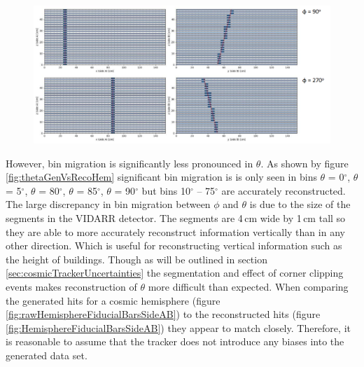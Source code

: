 \begin{figure}[htbp]
 \centering
 \includegraphics[width=\linewidth]{Chapter5/Figs/cosmicBinMigrationSideB.png}
 \label{fig:cosmicBinMigrationSideB}
\end{figure}

However, bin migration is significantly less pronounced in $\theta$. As shown by figure \ref{fig:thetaGenVsRecoHem} significant bin migration is is only seen in bins $\theta$ = 0$^\circ$, $\theta$ = 5$^\circ$, $\theta$ = 80$^\circ$, $\theta$ = 85$^\circ$, $\theta$ = 90$^\circ$ but bins 10$^\circ$ -- 75$^\circ$ are accurately reconstructed. The large discrepancy in bin migration between $\phi$ and $\theta$ is due to the size of the segments in the VIDARR detector. The segments are 4\,cm wide by 1\,cm tall so they are able to more accurately reconstruct information vertically than in any other direction. Which is useful for reconstructing vertical information such as the height of buildings. Though as will be outlined in section \ref{sec:cosmicTrackerUncertainties} the segmentation and effect of corner clipping events makes reconstruction of $\theta$ more difficult than expected. When comparing the generated hits for a cosmic hemisphere (figure \ref{fig:rawHemisphereFiducialBarsSideAB}) to the reconstructed hits (figure \ref{fig:HemisphereFiducialBarsSideAB}) they appear to match closely. Therefore, it is reasonable to assume that the tracker does not introduce any biases into the generated data set.

